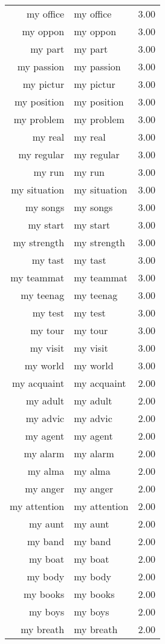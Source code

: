 \begin{table}[ht]
\begin{tabular}{rlr}
  my office & my office & 3.00 \\ 
  my oppon & my oppon & 3.00 \\ 
  my part & my part & 3.00 \\ 
  my passion & my passion & 3.00 \\ 
  my pictur & my pictur & 3.00 \\ 
  my position & my position & 3.00 \\ 
  my problem & my problem & 3.00 \\ 
  my real & my real & 3.00 \\ 
  my regular & my regular & 3.00 \\ 
  my run & my run & 3.00 \\ 
  my situation & my situation & 3.00 \\ 
  my songs & my songs & 3.00 \\ 
  my start & my start & 3.00 \\ 
  my strength & my strength & 3.00 \\ 
  my tast & my tast & 3.00 \\ 
  my teammat & my teammat & 3.00 \\ 
  my teenag & my teenag & 3.00 \\ 
  my test & my test & 3.00 \\ 
  my tour & my tour & 3.00 \\ 
  my visit & my visit & 3.00 \\ 
  my world & my world & 3.00 \\ 
  my acquaint & my acquaint & 2.00 \\ 
  my adult & my adult & 2.00 \\ 
  my advic & my advic & 2.00 \\ 
  my agent & my agent & 2.00 \\ 
  my alarm & my alarm & 2.00 \\ 
  my alma & my alma & 2.00 \\ 
  my anger & my anger & 2.00 \\ 
  my attention & my attention & 2.00 \\ 
  my aunt & my aunt & 2.00 \\ 
  my band & my band & 2.00 \\ 
  my boat & my boat & 2.00 \\ 
  my body & my body & 2.00 \\ 
  my books & my books & 2.00 \\ 
  my boys & my boys & 2.00 \\ 
  my breath & my breath & 2.00 \\ 

\end{tabular}
\end{table}
